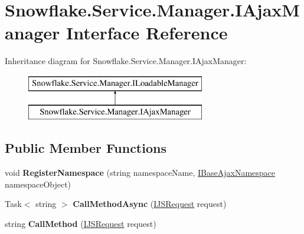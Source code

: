 \hypertarget{interface_snowflake_1_1_service_1_1_manager_1_1_i_ajax_manager}{}\section{Snowflake.\+Service.\+Manager.\+I\+Ajax\+Manager Interface Reference}
\label{interface_snowflake_1_1_service_1_1_manager_1_1_i_ajax_manager}
Inheritance diagram for Snowflake.\+Service.\+Manager.\+I\+Ajax\+Manager\+:\begin{figure}[H]
\begin{center}
\leavevmode
\includegraphics[height=2.000000cm]{interface_snowflake_1_1_service_1_1_manager_1_1_i_ajax_manager}
\end{center}
\end{figure}
\subsection*{Public Member Functions}
\begin{DoxyCompactItemize}
\item 
\hypertarget{interface_snowflake_1_1_service_1_1_manager_1_1_i_ajax_manager_a3ad54521d13be90a1780aed2bf405c92}{}void {\bfseries Register\+Namespace} (string namespace\+Name, \hyperlink{interface_snowflake_1_1_ajax_1_1_i_base_ajax_namespace}{I\+Base\+Ajax\+Namespace} namespace\+Object)\label{interface_snowflake_1_1_service_1_1_manager_1_1_i_ajax_manager_a3ad54521d13be90a1780aed2bf405c92}

\item 
\hypertarget{interface_snowflake_1_1_service_1_1_manager_1_1_i_ajax_manager_a3c8f17ccbe4db1b0912d924107e098ef}{}Task$<$ string $>$ {\bfseries Call\+Method\+Async} (\hyperlink{interface_snowflake_1_1_ajax_1_1_i_j_s_request}{I\+J\+S\+Request} request)\label{interface_snowflake_1_1_service_1_1_manager_1_1_i_ajax_manager_a3c8f17ccbe4db1b0912d924107e098ef}

\item 
\hypertarget{interface_snowflake_1_1_service_1_1_manager_1_1_i_ajax_manager_a5bdf8f37a2d4b40f1e9eaf68ccfa4e31}{}string {\bfseries Call\+Method} (\hyperlink{interface_snowflake_1_1_ajax_1_1_i_j_s_request}{I\+J\+S\+Request} request)\label{interface_snowflake_1_1_service_1_1_manager_1_1_i_ajax_manager_a5bdf8f37a2d4b40f1e9eaf68ccfa4e31}

\end{DoxyCompactItemize}
